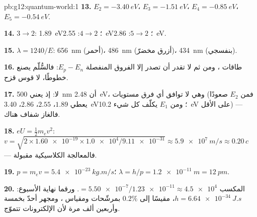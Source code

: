 \begin{solution}{pb:g12:quantum-world:1}
\textbf{13.} $E_2 = \qty{-3.40}{eV}$، $E_3 = \qty{-1.51}{eV}$،
$E_4 = \qty{-0.85}{eV}$، $E_5 = \qty{-0.54}{eV}$.

\textbf{14.} $3 \to 2$: \qty{1.89}{eV}؛ $4 \to 2$: \qty{2.55}{eV}؛
$5 \to 2$: \qty{2.86}{eV}.

\textbf{15.} $\lambda = 1240/E$: \qty{656}{nm} (أحمر)، \qty{486}{nm}
(أزرق مخضرّ)، \qty{434}{nm} (بنفسجي).

\textbf{16.} طاقات  ، ومن ثم لا تقدر أن تصدر إلا
الفروق المنفصلة $E_p - E_n$: فالسُّلّم يصنع خطوطًا، لا
قوس قزح.

\textbf{17.} لا: إذ يعني \qty{500}{nm} أن \qty{2.48}{eV}، وهي لا توافق أي
فرق مستويات (فمن $E_2$ صعودًا يعطي $1.89$، $2.55$، $2.86$،
\qty{3.40}{eV}؛ ومن $E_1$ يكلّف كل شيء \qty{10.2}{eV} على الأقل)
--- فالغاز شفاف هناك.

\textbf{18.} $eU = \tfrac12 m_e v^2$: $v = \sqrt{2 \times
\num{1.60e-19} \times \num{1.0e4}/\num{9.11e-31}} \approx
\qty{5.9e7}{m/s} \approx 0.20\,c$ --- فالمعالجة الكلاسيكية مقبولة.

\textbf{19.} $p = m_e v = \qty{5.4e-23}{kg.m/s}$؛
$\lambda = h/p = \qty{1.2e-11}{m} = \qty{12}{pm}$.

\textbf{20.} المكسب $= \num{5.50e-7}/\num{1.23e-11} \approx \num{4.5e4}$.
ورقما نهاية الأسبوع: $h = \qty{6.64e-34}{J.s}$، مقيسًا إلى
$0.2\%$ بمرشّحات ومقياس ، ومجهر
أحدّ بخمسة وأربعين ألف مرة لأن الإلكترونات تتموّج.
\end{solution}
